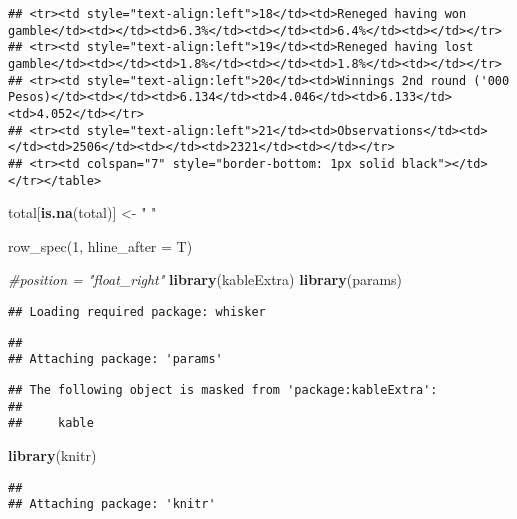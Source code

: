 \documentclass[]{article}
\newenvironment{Shaded}{\begin{snugshade}}{\end{snugshade}}
\newcommand{\KeywordTok}[1]{\textcolor[rgb]{0.13,0.29,0.53}{\textbf{#1}}}
\newcommand{\StringTok}[1]{\textcolor[rgb]{0.31,0.60,0.02}{#1}}
\newcommand{\CommentTok}[1]{\textcolor[rgb]{0.56,0.35,0.01}{\textit{#1}}}
\newcommand{\NormalTok}[1]{#1}
\begin{document}
\begin{verbatim}
## <tr><td style="text-align:left">18</td><td>Reneged having won gamble</td><td></td><td>6.3%</td><td></td><td>6.4%</td><td></td></tr>
## <tr><td style="text-align:left">19</td><td>Reneged having lost gamble</td><td></td><td>1.8%</td><td></td><td>1.8%</td><td></td></tr>
## <tr><td style="text-align:left">20</td><td>Winnings 2nd round ('000 Pesos)</td><td></td><td>6.134</td><td>4.046</td><td>6.133</td><td>4.052</td></tr>
## <tr><td style="text-align:left">21</td><td>Observations</td><td></td><td>2506</td><td></td><td>2321</td><td></td></tr>
## <tr><td colspan="7" style="border-bottom: 1px solid black"></td></tr></table>
\end{verbatim}

\begin{Shaded}
\begin{Highlighting}[]
\NormalTok{total[}\KeywordTok{is.na}\NormalTok{(total)] <-}\StringTok{ " "}
\end{Highlighting}
\end{Shaded}

row\_spec(1, hline\_after = T)

\begin{Shaded}
\begin{Highlighting}[]
\CommentTok{#position = "float_right" }
\KeywordTok{library}\NormalTok{(kableExtra)}
\KeywordTok{library}\NormalTok{(params)}
\end{Highlighting}
\end{Shaded}

\begin{verbatim}
## Loading required package: whisker
\end{verbatim}

\begin{verbatim}
## 
## Attaching package: 'params'
\end{verbatim}

\begin{verbatim}
## The following object is masked from 'package:kableExtra':
## 
##     kable
\end{verbatim}

\begin{Shaded}
\begin{Highlighting}[]
\KeywordTok{library}\NormalTok{(knitr)}
\end{Highlighting}
\end{Shaded}

\begin{verbatim}
## 
## Attaching package: 'knitr'
\end{verbatim}
\end{document}

